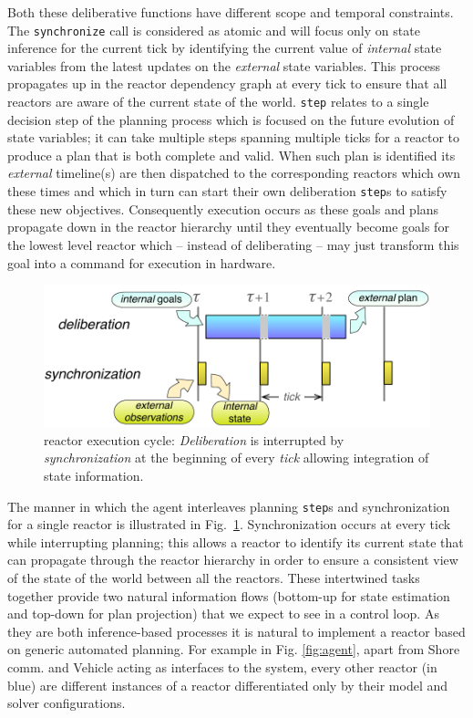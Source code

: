 Both these deliberative functions have different scope and temporal
constraints. The \texttt{synchronize} call is considered as atomic and
will focus only on state inference for the current tick by identifying
the current value of {\em internal} state variables from the latest
updates on the {\em external} state variables. This process propagates
up in the reactor dependency graph at every tick to ensure that all
reactors are aware of the current state of the world. \texttt{step}
relates to a single decision step of the planning process which is
focused on the future evolution of state variables; it can take
multiple steps spanning multiple ticks for a reactor to produce a plan
that is both complete and valid. When such plan is identified
 its {\em external}
timeline(s) are then dispatched to the corresponding reactors which
own these times and which in turn can start their own deliberation
\texttt{step}s to satisfy these new objectives. Consequently execution
occurs as these goals and plans propagate down in the reactor
hierarchy until they eventually become goals for the lowest level
reactor which -- instead of deliberating -- may just transform this
goal into a command for execution in hardware.

\begin{figure}[!htbp]
  \centering
  \vskip-1pc
  \includegraphics[width=0.55\columnwidth]{figs/tick-cycle}
  \caption{\small \rx reactor execution cycle: {\em Deliberation} is
    interrupted by {\em synchronization} at the beginning of every
    {\em tick} allowing integration of state information.}
  \label{fig:tick-exec}
  \vskip-0.8pc
\end{figure}

The manner in which the agent interleaves planning \texttt{step}s and
synchronization for a single reactor is illustrated in
Fig.~\ref{fig:tick-exec}. Synchronization occurs at every tick while
interrupting planning; this allows a reactor to identify its current
state that can propagate through the reactor hierarchy in order to
ensure a consistent view of the state of the world between all the
reactors.
These intertwined tasks together provide two natural information flows
(bottom-up for state estimation and top-down for plan projection) that
we expect to see in a control loop. As they are both inference-based
processes it is natural to implement a reactor based on generic
automated planning. For example in Fig. \ref{fig:agent}, apart from
\textsf{Shore comm.} and \textsf{Vehicle} acting as interfaces to the
system, every other reactor (in blue) are different instances of a \eu
reactor differentiated only by their model and \eu solver
configurations.

